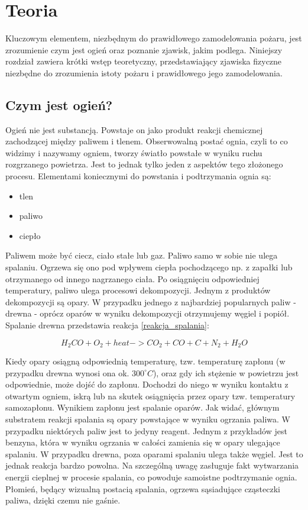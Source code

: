 ﻿%
\chapter{Teoria}
\label{cha:Teoria}
Kluczowym elementem, niezbędnym do prawidłowego zamodelowania pożaru,
jest zrozumienie czym jest ogień oraz poznanie zjawisk, jakim podlega. Niniejszy rozdział zawiera
krótki wstęp teoretyczny, przedstawiający zjawiska fizyczne niezbędne do zrozumienia istoty 
pożaru i prawidłowego jego zamodelowania.
\section {Czym jest ogień?}
Ogień nie jest substancją. Powstaje on jako produkt reakcji chemicznej zachodzącej między paliwem i tlenem.
Obserwowalną postać ognia, czyli to co widzimy i nazywamy ogniem, tworzy światło powstałe w wyniku ruchu rozgrzanego powietrza.
Jest to jednak tylko jeden z aspektów tego złożonego procesu.
Elementami koniecznymi do powstania i podtrzymania ognia są:
\begin{itemize}
\item tlen
\item paliwo
\item ciepło
\end{itemize}


Paliwem może być ciecz, ciało stałe lub gaz. Paliwo samo w sobie nie ulega spalaniu. Ogrzewa się ono pod wpływem ciepła
pochodzącego np. z zapałki lub otrzymanego od innego nagrzanego ciała. Po osiągnięciu
odpowiedniej temperatury, paliwo ulega procesowi dekompozycji. Jednym z produktów dekompozycji
są opary. W przypadku jednego z najbardziej popularnych paliw - drewna - oprócz oparów w wyniku dekompozycji otrzymujemy węgiel i popiół.
Spalanie drewna przedstawia reakcja \ref{reakcja_spalania}:

\begin {equation}
H_2CO+O_2 + heat ->CO_2 + CO+ C + N_2 + H_2O
\label {reakcja_spalania}
\end {equation}

Kiedy opary osiągną odpowiednią temperaturę, tzw. temperaturę zapłonu (w przypadku drewna wynosi ona ok. $300^\circ C$), oraz gdy ich stężenie
w powietrzu jest odpowiednie, może dojść do zapłonu. Dochodzi do niego w wyniku kontaktu z otwartym ogniem, iskrą lub na skutek osiągnięcia
przez opary tzw. temperatury samozapłonu. Wynikiem zapłonu jest spalanie oparów. Jak widać, głównym substratem reakcji spalania są opary powstające w wyniku
ogrzania paliwa. W przypadku niektórych paliw jest to jedyny reagent. Jednym z przykładów jest benzyna, która w wyniku ogrzania w całości zamienia się w opary ulegające spalaniu. W przypadku drewna, poza oparami spalaniu ulega także węgiel. Jest to jednak reakcja bardzo powolna.
Na szczególną uwagę zasługuje fakt wytwarzania energii cieplnej w procesie spalania, co powoduje samoistne podtrzymanie ognia. Płomień, będący
wizualną postacią spalania, ogrzewa sąsiadujące cząsteczki paliwa, dzięki czemu nie gaśnie.

